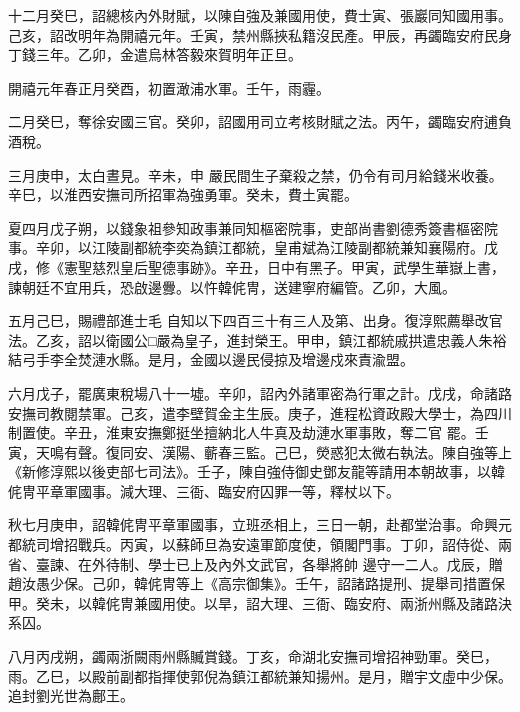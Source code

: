 \begin{pinyinscope}
 十二月癸巳，詔總核內外財賦，以陳自強及兼國用使，費士寅、張巖同知國用事。己亥，詔改明年為開禧元年。壬寅，禁州縣挾私籍沒民產。甲辰，再蠲臨安府民身丁錢三年。乙卯，金遣烏林答毅來賀明年正旦。



 開禧元年春正月癸酉，初置澉浦水軍。壬午，雨霾。



 二月癸巳，奪徐安國三官。癸卯，詔國用司立考核財賦之法。丙午，蠲臨安府逋負酒稅。



 三月庚申，太白晝見。辛未，申
 嚴民間生子棄殺之禁，仍令有司月給錢米收養。辛巳，以淮西安撫司所招軍為強勇軍。癸未，費土寅罷。



 夏四月戊子朔，以錢象祖參知政事兼同知樞密院事，吏部尚書劉德秀簽書樞密院事。辛卯，以江陵副都統李奕為鎮江都統，皇甫斌為江陵副都統兼知襄陽府。戊戌，修《憲聖慈烈皇后聖德事跡》。辛丑，日中有黑子。甲寅，武學生華嶽上書，諫朝廷不宜用兵，恐啟邊釁。以忤韓侂冑，送建寧府編管。乙卯，大風。



 五月己巳，賜禮部進士毛
 自知以下四百三十有三人及第、出身。復淳熙薦舉改官法。乙亥，詔以衛國公□嚴為皇子，進封榮王。甲申，鎮江都統戚拱遣忠義人朱裕結弓手李全焚漣水縣。是月，金國以邊民侵掠及增邊戍來責渝盟。



 六月戊子，罷廣東稅場八十一墟。辛卯，詔內外諸軍密為行軍之計。戊戌，命諸路安撫司教閱禁軍。己亥，遣李壁賀金主生辰。庚子，進程松資政殿大學士，為四川制置使。辛丑，淮東安撫鄭挺坐擅納北人牛真及劫漣水軍事敗，奪二官
 罷。壬寅，天鳴有聲。復同安、漢陽、蘄春三監。己巳，熒惑犯太微右執法。陳自強等上《新修淳熙以後吏部七司法》。壬子，陳自強侍御史鄧友龍等請用本朝故事，以韓侂冑平章軍國事。減大理、三衙、臨安府囚罪一等，釋杖以下。



 秋七月庚申，詔韓侂冑平章軍國事，立班丞相上，三日一朝，赴都堂治事。命興元都統司增招戰兵。丙寅，以蘇師旦為安遠軍節度使，領閣門事。丁卯，詔侍從、兩省、臺諫、在外待制、學士已上及內外文武官，各舉將帥
 邊守一二人。戊辰，贈趙汝愚少保。己卯，韓侂冑等上《高宗御集》。壬午，詔諸路提刑、提舉司措置保甲。癸未，以韓侂冑兼國用使。以旱，詔大理、三衙、臨安府、兩浙州縣及諸路決系囚。



 八月丙戌朔，蠲兩浙闕雨州縣贓賞錢。丁亥，命湖北安撫司增招神勁軍。癸巳，雨。乙巳，以殿前副都指揮使郭倪為鎮江都統兼知揚州。是月，贈宇文虛中少保。追封劉光世為鄜王。




\end{pinyinscope}
